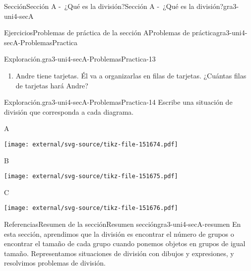 \documentclass[twoside,10pt,]{article}
\begin{document}
\begin{sectionptx}{Sección}{Sección A -~¿Qué es la división?}{}{Sección A -~¿Qué es la división?}{}{}{gra3-uni4-secA}
\begin{exercises-subsection}{Ejercicios}{Problemas de práctica de la sección A}{}{Problemas de práctica}{}{}{gra3-uni4-secA-ProblemasPractica}
\begin{divisionexercise}{11}{Exploración.}{}{gra3-uni4-secA-ProblemasPractica-13}
\begin{enumerate}[label=(\alph*)]
\item{}Andre tiene \textunderscore{}\textunderscore{}\textunderscore{}\textunderscore{}\textunderscore{}\textunderscore{}\textunderscore{}\textunderscore{}\textunderscore{}\textunderscore{} tarjetas. Él va a organizarlas en filas de \textunderscore{}\textunderscore{}\textunderscore{}\textunderscore{}\textunderscore{}\textunderscore{}\textunderscore{}\textunderscore{}\textunderscore{}\textunderscore{} tarjetas. ¿Cuántas filas de tarjetas hará Andre?%
\end{enumerate}
%
\end{divisionexercise}%
\begin{divisionexercise}{12}{Exploración.}{}{gra3-uni4-secA-ProblemasPractica-14}%
Escribe una situación de división que corresponda a cada diagrama.%
\begin{sidebyside}{6}{0.00333333333333333}{0.00333333333333333}{0.00666666666666667}%
\begin{sbspanel}{0.02}%
A%
\end{sbspanel}%
\begin{sbspanel}{0.3}%
\texttt{[image: external/svg-source/tikz-file-151674.pdf]}
\end{sbspanel}%
\begin{sbspanel}{0.02}%
B%
\end{sbspanel}%
\begin{sbspanel}{0.3}%
\texttt{[image: external/svg-source/tikz-file-151675.pdf]}
\end{sbspanel}%
\begin{sbspanel}{0.02}%
C%
\end{sbspanel}%
\begin{sbspanel}{0.3}%
\texttt{[image: external/svg-source/tikz-file-151676.pdf]}
\end{sbspanel}%
\end{sidebyside}%
\end{divisionexercise}%
\end{exercises-subsection}
%
%
\typeout{************************************************}
\typeout{************************************************}
%
\begin{references-subsection}{Referencias}{Resumen de la sección}{}{Resumen sección}{}{}{gra3-uni4-secA-resumen}
En esta sección, aprendimos que la división es encontrar el número de grupos o encontrar el tamaño de cada grupo cuando ponemos objetos en grupos de igual tamaño. Representamos situaciones de división con dibujos y expresiones, y resolvimos problemas de división.%

\end{references-subsection}
\end{sectionptx}
\end{document}
